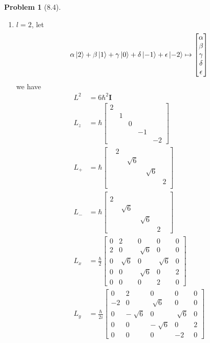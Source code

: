 \documentclass[twoside,11pt]{article}
\theoremstyle{definition}
\newtheorem{problem}{Problem}
\theoremstyle{remark}
\begin{document}
\begin{problem}[8.4]
\begin{enumerate}[label=Case \arabic*., leftmargin=*]
\item $l=2$, let
\begin{align*}
    \alpha\ket{2} + \beta\ket{1} + \gamma\ket{0} + \delta\ket{-1} + \epsilon\ket{-2}
    \mapsto
    \begin{bmatrix}
        \alpha\\ \beta\\ \gamma\\ \delta\\ \epsilon
    \end{bmatrix}
\end{align*}
we have 
\begin{align*}
    L^2 &= 6\hbar^2 \mathbf{I}\\ 
    L_z &= \hbar\begin{bmatrix}
        2 & & & & \\
        & 1 & & & \\
        & & 0 & & \\
        & & & -1 & \\
        & & & & -2
    \end{bmatrix}\\
    L_+ &= \hbar\begin{bmatrix}
        & 2 & & & \\
        & & \sqrt[]{6} & & \\
        & & & \sqrt[]{6} & \\
        & & & & 2\\
        & & & & 
    \end{bmatrix}\\
    L_- &= \hbar\begin{bmatrix}
        & & & & \\
        2 & & & & \\
        & \sqrt[]{6} & & & \\
        & & \sqrt[]{6} & & \\
        & & & 2 & 
    \end{bmatrix}\\
    L_x &= \frac{\hbar}{2}\begin{bmatrix}
        0 & 2 & 0 & 0 & 0 \\
        2 & 0 & \sqrt[]{6} & 0 & 0 \\
        0 & \sqrt[]{6} & 0 & \sqrt[]{6} & 0\\
        0 & 0 & \sqrt[]{6} & 0 & 2\\
        0 & 0 & 0 & 2 & 0
    \end{bmatrix}\\
    L_y &= \frac{\hbar}{2i}\begin{bmatrix}
        0 & 2 & 0 & 0 & 0 \\
        -2 & 0 & \sqrt[]{6} & 0 & 0 \\
        0 & -\sqrt[]{6} & 0 & \sqrt[]{6} & 0\\
        0 & 0 & -\sqrt[]{6} & 0 & 2\\
        0 & 0 & 0 & -2 & 0
    \end{bmatrix}
\end{align*}


\end{enumerate}
\end{problem}
\end{document}
